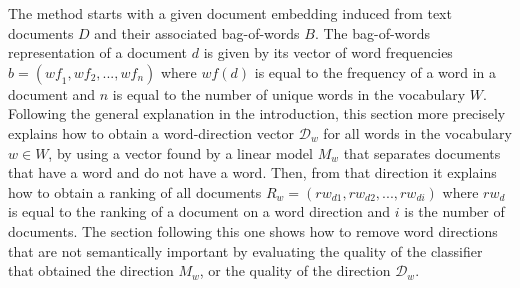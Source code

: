  The method starts with a given document embedding  induced from text documents $D$ and their associated bag-of-words $B$. The bag-of-words representation of a document $d$ is given by its vector of word frequencies $b = (\textit{wf}_1, {wf}_2, ..., {wf}_n)$ where ${wf}(d)$ is equal to the frequency of a word in a document and $n$ is equal to the number of unique words  in the vocabulary $W$.
  Following the general explanation in the introduction, this section more precisely explains how to obtain a word-direction vector $\mathcal{D}_w$ for all words in the vocabulary $w \in W$, by using a vector found by a linear model $M_w$ that separates documents that have a word and do not have a word. Then, from that direction it explains  how to obtain a ranking of all documents $R_w = ({rw}_{d1}, {rw}_{d2}, ..., {rw}_{di})$ where ${rw}_{d}$ is equal to the ranking of a document on a word direction and $i$ is the number of documents. The section following this one shows how to remove word directions that are not semantically important by evaluating the quality of the classifier that obtained the direction $M_w$, or the quality of the direction $\mathcal{D}_w$.



